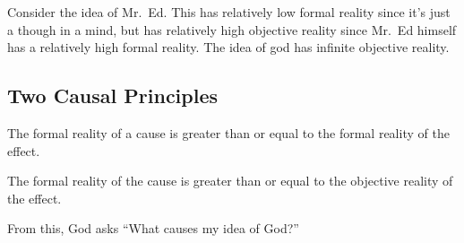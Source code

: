 \begin{example}
Consider the idea of Mr.\ Ed. This has relatively low formal reality since it's just a though in a mind, but has relatively high objective reality since Mr.\ Ed himself has a relatively high formal reality. The idea of god has infinite objective reality.
\end{example}

\subsection{Two Causal Principles}

\begin{proposition}
The formal reality of a cause is greater than or equal to the formal reality of the effect.
\end{proposition}

\begin{proposition}
The formal reality of the cause is greater than or equal to the objective reality of the effect.
\end{proposition}

From this, God asks ``What causes my idea of God?''